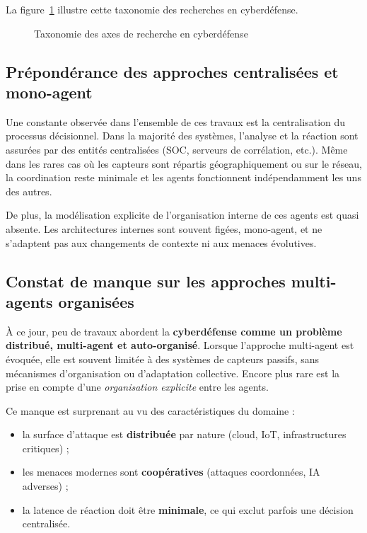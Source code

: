 \documentclass[ twoside,openright,titlepage,numbers=noenddot,headinclude,%
                footinclude=true,cleardoublepage=empty,abstractoff, %
                BCOR=5mm,paper=a4,fontsize=11pt,%
                french,american,%
                ]{scrreprt}
\begin{document}
La figure~\ref{fig:taxonomy-cyberdef} illustre cette taxonomie des recherches en cyberdéfense.

\begin{figure}[H]
    \centering
    \caption{Taxonomie des axes de recherche en cyberdéfense}
    \label{fig:taxonomy-cyberdef}
\end{figure}

\vspace{0.5em}
\subsection*{Prépondérance des approches centralisées et mono-agent}

Une constante observée dans l’ensemble de ces travaux est la centralisation du processus décisionnel. Dans la majorité des systèmes, l’analyse et la réaction sont assurées par des entités centralisées (SOC, serveurs de corrélation, etc.). Même dans les rares cas où les capteurs sont répartis géographiquement ou sur le réseau, la coordination reste minimale et les agents fonctionnent indépendamment les uns des autres.

De plus, la modélisation explicite de l’organisation interne de ces agents est quasi absente. Les architectures internes sont souvent figées, mono-agent, et ne s’adaptent pas aux changements de contexte ni aux menaces évolutives.

\vspace{0.5em}
\subsection*{Constat de manque sur les approches multi-agents organisées}

À ce jour, peu de travaux abordent la \textbf{cyberdéfense comme un problème distribué, multi-agent et auto-organisé}. Lorsque l’approche multi-agent est évoquée, elle est souvent limitée à des systèmes de capteurs passifs, sans mécanismes d’organisation ou d’adaptation collective. Encore plus rare est la prise en compte d'une \textit{organisation explicite} entre les agents.

Ce manque est surprenant au vu des caractéristiques du domaine :
\begin{itemize}
    \item la surface d’attaque est \textbf{distribuée} par nature (cloud, IoT, infrastructures critiques) ;
    \item les menaces modernes sont \textbf{coopératives} (attaques coordonnées, IA adverses) ;
    \item la latence de réaction doit être \textbf{minimale}, ce qui exclut parfois une décision centralisée.
\end{itemize}
\end{document}
